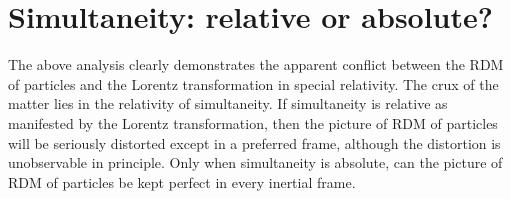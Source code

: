 \section{Simultaneity: relative or absolute?}

The above analysis clearly demonstrates the apparent conflict between the RDM of particles and the Lorentz transformation in special relativity. The crux of the matter lies in the relativity of simultaneity. If simultaneity is relative as manifested by the Lorentz transformation, then the picture of RDM of particles will be seriously distorted except in a preferred frame, although the distortion is unobservable in principle. Only when simultaneity is absolute, can the picture of RDM of particles be kept perfect in every inertial frame. 


